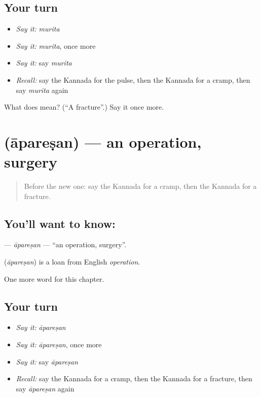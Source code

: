 \subsection*{Your turn}
\begin{itemize}
\raggedright
  \item \emph{Say it:} \emph{murita}
  \item \emph{Say it:} \emph{murita}, once more
  \item \emph{Say it:} say \emph{murita}
  \item \emph{Recall:} say the Kannada for the pulse, then the Kannada for a cramp, then say \emph{murita} again
\end{itemize}

\begin{tcolorbox}[breakable,colback=teal!4,colframe=teal!35!black,title={Before you move on}]
What does  mean? (\textquotedblleft{}A fracture\textquotedblright{}.) Say it once more.
\end{tcolorbox}
\section[\texorpdfstring{\kn{ಆಪರೇಷನ್} (āpareṣan)}{ಆಪರೇಷನ್ (āpareṣan)}]{ (āpareṣan) — an operation, surgery}

\label{lesson:KA-C283-aparesan}



\begin{quote}
Before the new one: say the Kannada for a cramp, then the Kannada for a fracture.
\end{quote}

\subsection*{You'll want to know: }
\textbf{} — \emph{āpareṣan} — \textquotedblleft{}an operation, surgery\textquotedblright{}.

\begin{cousinweb}
\textbf{} (\emph{āpareṣan}) is a loan from English \emph{operation}.
\end{cousinweb}

\begin{grammarlens}[title={What you've built}]
One more word for this chapter.
\end{grammarlens}

\subsection*{Your turn}
\begin{itemize}
\raggedright
  \item \emph{Say it:} \emph{āpareṣan}
  \item \emph{Say it:} \emph{āpareṣan}, once more
  \item \emph{Say it:} say \emph{āpareṣan}
  \item \emph{Recall:} say the Kannada for a cramp, then the Kannada for a fracture, then say \emph{āpareṣan} again
\end{itemize}

